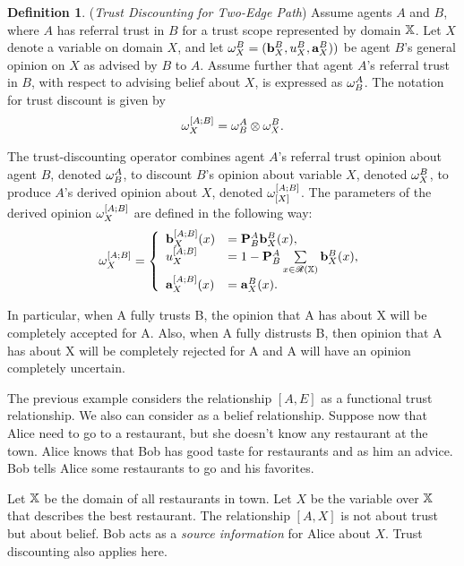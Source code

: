 \documentclass[a4paper,12pt]{article}
\theoremstyle{definition}
\newtheorem{definition}{Definition}[section]
\numberwithin{equation}{section}
\begin{document}
\begin{definition}
(\emph{Trust Discounting for Two-Edge Path}) Assume agents $A$ and $B$, where $A$ has referral trust in $B$ for a trust scope represented by domain $\mathbb{X}$. Let $X$ denote a variable on domain $X$, and let $\omega^{B}_{X} = (\mathbf{b}^{B}_{X}, u^{B}_{X}, \mathbf{a}^{B}_{X}))$ be agent $B$’s general opinion on $X$ as advised by $B$ to $A$. Assume further that agent $A$’s referral trust in $B$, with respect to advising belief about $X$, is expressed as $\omega^{A}_{B}$. The notation for trust discount is given by
\begin{equation}
	\omega^{[A;B]}_{X} = \omega^{A}_{B} \otimes \omega^{B}_{X} \text{.}
\end{equation}

The trust-discounting operator combines agent $A$’s referral trust opinion about agent $B$, denoted $\omega^{A}_{B}$, to discount $B$’s opinion about variable $X$, denoted $\omega^{B}_{X}$, to produce $A$’s derived opinion about $X$, denoted $\omega^{[A;B]}_{[X]}$. The parameters of the derived opinion $\omega^{[A;B]}_{X}$ are defined in the following way:
\begin{equation}
	\omega^{[A;B]}_{X} = \left\{
	\begin{array}{ll}
		\mathbf{b}^{[A;B]}_{X}(x) & = \mathbf{P}^{A}_{B} \mathbf{b}^{B}_{X}(x) \text{,}\\
		u^{[A;B]}_{X} & = 1 - \mathbf{P}^{A}_{B} \sum\limits_{x \in \mathcal{R}(\mathbb{X})} \mathbf{b}^{B}_{X}(x) \text{,} \\
		\mathbf{a}^{[A;B]}_{X}(x) & = \mathbf{a}^{B}_{X}(x) \text{.}
	\end{array}
	\right.
\end{equation}
\end{definition}

In particular, when A fully trusts B, the opinion that A has about X will be completely accepted for A. Also, when A fully distrusts B, then opinion that A has about X will be completely rejected for A and A will have an opinion completely uncertain.

The previous example considers the relationship $[A, E]$ as a functional trust relationship. We also can consider as a belief relationship. Suppose now that Alice need to go to a restaurant, but she doesn't know any restaurant at the town. Alice knows that Bob has good taste for restaurants and as him an advice. Bob tells Alice some restaurants to go and his favorites.

Let $\mathbb{X}$ be the domain of all restaurants in town. Let $X$ be the variable over $\mathbb{X}$ that describes the best restaurant. The relationship $[A, X]$ is not about trust but about belief. Bob acts as a \emph{source information} for Alice about $X$. Trust discounting also applies here.
\end{document}
